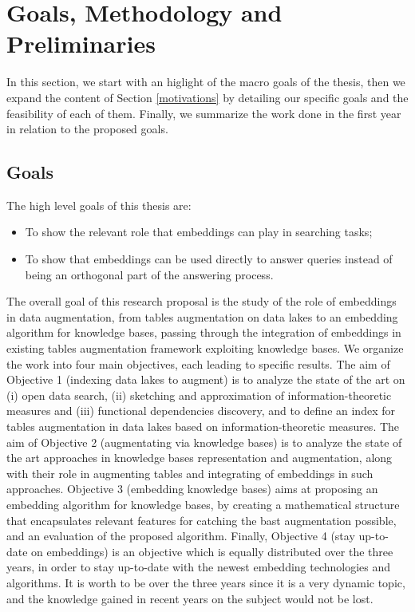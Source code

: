 \section{Goals, Methodology and Preliminaries}\label{goals}
In this section, we start with an higlight of the macro goals of the thesis, then we expand the content of Section \ref{motivations} by detailing our specific goals and the feasibility of each of them. Finally, we summarize the work done in the first year in relation to the proposed goals.

\subsection{Goals}\label{sub_goals}
The high level goals of this thesis are:
\begin{itemize}
    \item To show the relevant role that embeddings can play in searching tasks;
    \item To show that embeddings can be used directly to answer queries instead of being an orthogonal part of the answering process.
\end{itemize}

The overall goal of this research proposal is the study of the role of embeddings in data augmentation, from tables augmentation on data lakes to an embedding algorithm for knowledge bases, passing through the integration of embeddings in existing tables augmentation framework exploiting knowledge bases. We organize the work into four main objectives, each leading to specific results. 
The aim of Objective 1 (indexing data lakes to augment) is to analyze the state of the art on (i) open data search, (ii) sketching and approximation of information-theoretic measures and (iii) functional dependencies discovery, and to define an index for tables augmentation in data lakes based on information-theoretic measures. 
The aim of Objective 2 (augmentating via knowledge bases) is to analyze the state of the art approaches in knowledge bases representation and augmentation, along with their role in augmenting tables and integrating of embeddings in such approaches. 
Objective 3 (embedding knowledge bases) aims at proposing an embedding algorithm for knowledge bases, by creating a mathematical structure that encapsulates relevant features for catching the bast augmentation possible, and an evaluation of the proposed algorithm. 
Finally, Objective 4 (stay up-to-date on embeddings) is an objective which is equally distributed over the three years, in order to stay up-to-date with the newest embedding technologies and algorithms. It is worth to be over the three years since it is a very dynamic topic, and the knowledge gained in recent years on the subject would not be lost.


